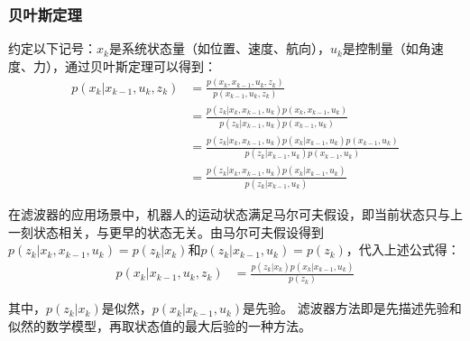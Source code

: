 \subsubsection{贝叶斯定理}
\par 约定以下记号：$x_k$是系统状态量（如位置、速度、航向），$u_k$是控制量（如角速度、力），通过贝叶斯定理可以得到：
\begin{equation}
	\begin{split}
		p(x_k|x_{k-1},u_k,z_k) & = \frac{p(x_k,x_{k-1},u_k,z_k)}{p(x_{k-1},u_k,z_k)} \\
		& = \frac{p(z_k|x_k,x_{k-1},u_k)p(x_k,x_{k-1},u_k)}{p(z_k|x_{k-1},u_k)p(x_{k-1},u_k)} \\
		&= \frac{p(z_k|x_k,x_{k-1},u_k)p(x_k|x_{k-1},u_k)p(x_{k-1},u_k)}{p(z_k|x_{k-1},u_k)p(x_{k-1},u_k)} \\
		&= \frac{p(z_k|x_k,x_{k-1},u_k)p(x_k|x_{k-1},u_k)}{p(z_k|x_{k-1},u_k)}
	\end{split}
\end{equation}
\par 在滤波器的应用场景中，机器人的运动状态满足马尔可夫假设，即当前状态只与上一刻状态相关，与更早的状态无关。由马尔可夫假设得到$p(z_k|x_k,x_{k-1},u_k)=p(z_k|x_k)$和$p(z_k|x_{k-1},u_k)=p(z_k)$，代入上述公式得：
\begin{equation}
	\begin{split}
		p(x_k|x_{k-1},u_k,z_k) & = \frac{p(z_k|x_k)p(x_k|x_{k-1},u_k)}{p(z_k)}
	\end{split}
\end{equation}
\par 其中，$p(z_k|x_k)$是似然，$p(x_k|x_{k-1},u_k)$是先验。
滤波器方法即是先描述先验和似然的数学模型，再取状态值的最大后验的一种方法。


